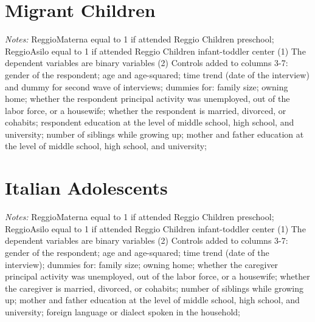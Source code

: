 \documentclass[12pt,english]{article}
\begin{document}
\section{Migrant Children}

 {

\FloatBarrier
\begin{table}[htb!]
\begin{small}
.tex}
\end{small}
   \begin{tablenotes}
      \footnotesize
      \item \emph{Notes:} ReggioMaterna equal to 1 if attended Reggio Children preschool; ReggioAsilo equal to 1 if attended Reggio Children infant-toddler center (1) The dependent variables are binary variables (2) Controls added to columns 3-7: gender of the respondent; age and age-squared; time trend (date of the interview) and dummy for second wave of interviews; dummies for: family size; owning home; whether the respondent principal activity was unemployed, out of the labor force, or a housewife; whether the respondent is married, divorced, or cohabits; respondent education at the level of middle school, high school, and university; number of siblings while growing up; mother and father education at the level of middle school, high school, and university; 
    \end{tablenotes}
\end{table}

}

\pagebreak

\section{Italian Adolescents}

 {

\FloatBarrier
\begin{table}[htb!]
\begin{small}
.tex}
\end{small}
   \begin{tablenotes}
      \footnotesize
      \item \emph{Notes:} ReggioMaterna equal to 1 if attended Reggio Children preschool; ReggioAsilo equal to 1 if attended Reggio Children infant-toddler center (1) The dependent variables are binary variables (2) Controls added to columns 3-7: gender of the respondent; age and age-squared; time trend (date of the interview); dummies for: family size; owning home; whether the caregiver principal activity was unemployed, out of the labor force, or a housewife; whether the caregiver is married, divorced, or cohabits; number of siblings while growing up; mother and father education at the level of middle school, high school, and university; foreign language or dialect spoken in the household; 
    \end{tablenotes}
\end{table}

}
\end{document}
